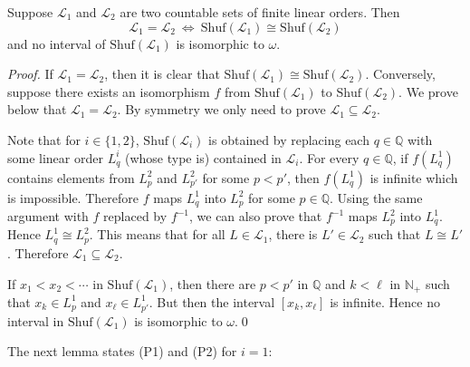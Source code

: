 \documentclass[envcountsame]{llncs}
\renewcommand{\L}{\mathcal L}
\newcommand{\N}{\mathbb N}
\renewcommand{\L}{\mathcal L}
\newcommand{\Q}{\mathbb Q}
\newcommand{\Shuf}{\mathrm{Shuf}}
\begin{document}
\begin{lemma}\label{lem:shuf_finite}
  Suppose $\L_1$ and $\L_2$ are two countable sets of finite linear
  orders. Then
  \[
      \L_1=\L_2 \ \iff \ \Shuf(\L_1) \cong \Shuf(\L_2)
  \]
  and no interval of $\Shuf(\L_1)$ is isomorphic to $\omega$.
\end{lemma}
\begin{proof}
  If $\L_1=\L_2$, then it is clear that $\Shuf(\L_1) \cong
  \Shuf(\L_2)$. Conversely, suppose there exists an isomorphism $f$
  from $\Shuf(\L_1)$ to $\Shuf(\L_2)$. We prove below that
  $\L_1=\L_2$. By symmetry we only need to prove $\L_1 \subseteq
  \L_2$.

  Note that for $i\in \{1,2\}$, $\Shuf(\L_i)$ is obtained by replacing
  each $q\in \Q$ with some linear order $L^i_q$ (whose type is)
  contained in $\L_i$. For every $q\in \Q$, if $f(L^1_q)$ contains
  elements from $L^2_p$ and $L^2_{p'}$ for some $p<p'$, then
  $f(L^1_q)$ is infinite which is impossible. Therefore $f$ maps
  $L^1_q$ into $L^2_p$ for some $p\in \Q$.  Using the same argument
  with $f$ replaced by $f^{-1}$, we can also prove that $f^{-1}$ maps
  $L^2_p$ into $L^1_q$. Hence $L^1_q \cong L^2_p$. This means that for
  all $L\in \L_1$, there is $L'\in \L_2$ such that $L\cong
  L'$. Therefore $\L_1 \subseteq \L_2$. 

  If $x_1<x_2<\cdots$ in $\Shuf(\L_1)$, then there are $p<p'$ in $\Q$
  and $k<\ell$ in $\N_+$ such that $x_k\in L^1_p$ and $x_\ell\in
  L^1_{p'}$. But then the interval $[x_k,x_\ell]$ is infinite. Hence
  no interval in $\Shuf(\L_1)$ is isomorphic to $\omega$.\qed
\end{proof}
The next lemma states (P1) and (P2) for $i=1$:
\end{document}
